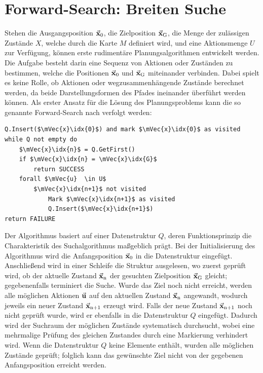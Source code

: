 \section{Forward-Search: Breiten Suche}
Stehen die Ausgangsposition $\vec{\mathbf{x}}_{\text{0}}$, die Zielposition $\vec{\mathbf{x}}_{\text{G}}$, die Menge der zulässigen Zustände $X$, welche durch die Karte $M$ definiert wird, und eine Aktionsmenge $U$ zur Verfügung, können erste rudimentäre Planungsalgorithmen entwickelt werden. Die Aufgabe besteht darin eine Sequenz von Aktionen oder Zuständen zu bestimmen, welche die Positionen $\vec{\mathbf{x}}_{\text{0}}$ und $\vec{\mathbf{x}}_{\text{G}}$ miteinander verbinden. Dabei spielt es keine Rolle, ob Aktionen oder wegzusammenhängende Zustände berechnet werden, da beide Darstellungsformen des Pfades ineinander überführt werden können. Als erster Ansatz für die Lösung des Planungsproblems kann die so genannte Forward-Search nach \cite[S. 28]{PlanAlgo} verfolgt werden:
\begin{lstlisting}[mathescape=true, caption={Ablauf der Forward-Search in Pseudocode},captionpos=bot]
Q.Insert($\mVec{x}\idx{0}$) and mark $\mVec{x}\idx{0}$ as visited
while Q not empty do
	$\mVec{x}\idx{n}$ = Q.GetFirst()
	if $\mVec{x}\idx{n} = \mVec{x}\idx{G}$
		return SUCCESS
	forall $\mVec{u}  \in U$
		$\mVec{x}\idx{n+1}$ not visited
			Mark $\mVec{x}\idx{n+1}$ as visited
			Q.Insert($\mVec{x}\idx{n+1}$)
return FAILURE
\end{lstlisting}
Der Algorithmus basiert auf einer Datenstruktur $Q$, deren Funktionsprinzip die Charakteristik des Suchalgorithmus maßgeblich prägt. Bei der Initialisierung des Algorithmus wird die Anfangsposition $\vec{\mathbf{x}}_{\text{0}}$ in die Datenstruktur eingefügt. Anschließend wird in einer Schleife die Struktur ausgelesen, wo zuerst geprüft wird, ob der aktuelle Zustand $\vec{\mathbf{x}}_{\text{n}}$ der gesuchten Zielposition $\vec{\mathbf{x}}_{\text{G}}$ gleicht; gegebenenfalls terminiert die Suche. Wurde das Ziel noch nicht erreicht, werden alle möglichen Aktionen $\vec{\mathbf{u}}$ auf den aktuellen Zustand $\vec{\mathbf{x}}_{\text{n}}$ angewandt, wodurch jeweils ein neuer Zustand $\vec{\mathbf{x}}_{\text{n+1}}$ erzeugt wird. Falls der neue Zustand $\vec{\mathbf{x}}_{\text{n+1}}$ noch nicht geprüft wurde, wird er ebenfalls in die Datenstruktur $Q$ eingefügt. Dadurch wird der Suchraum der möglichen Zustände systematisch durchsucht, wobei eine mehrmalige Prüfung des gleichen Zustandes durch eine Markierung verhindert wird. Wenn die Datenstruktur $Q$ keine Elemente enthält, wurden alle möglichen Zustände geprüft; folglich kann das gewünschte Ziel nicht von der gegebenen Anfangsposition erreicht werden.

